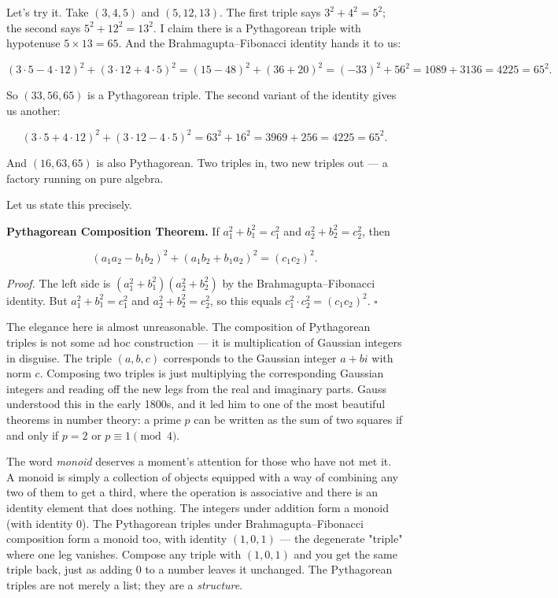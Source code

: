 Let's try it. Take $(3, 4, 5)$ and $(5, 12, 13)$. The first triple says $3^2 + 4^2 = 5^2$; the second says $5^2 + 12^2 = 13^2$. I claim there is a Pythagorean triple with hypotenuse $5 \times 13 = 65$. And the Brahmagupta--Fibonacci identity hands it to us:

\[(3 \cdot 5 - 4 \cdot 12)^2 + (3 \cdot 12 + 4 \cdot 5)^2 = (15 - 48)^2 + (36 + 20)^2 = (-33)^2 + 56^2 = 1089 + 3136 = 4225 = 65^2.\]

So $(33, 56, 65)$ is a Pythagorean triple. The second variant of the identity gives us another:

\[(3 \cdot 5 + 4 \cdot 12)^2 + (3 \cdot 12 - 4 \cdot 5)^2 = 63^2 + 16^2 = 3969 + 256 = 4225 = 65^2.\]

And $(16, 63, 65)$ is also Pythagorean. Two triples in, two new triples out --- a factory running on pure algebra.


Let us state this precisely.

\textbf{Pythagorean Composition Theorem.} If $a_1^2 + b_1^2 = c_1^2$ and $a_2^2 + b_2^2 = c_2^2$, then

\[(a_1 a_2 - b_1 b_2)^2 + (a_1 b_2 + b_1 a_2)^2 = (c_1 c_2)^2.\]

\textit{Proof.} The left side is $(a_1^2 + b_1^2)(a_2^2 + b_2^2)$ by the Brahmagupta--Fibonacci identity. But $a_1^2 + b_1^2 = c_1^2$ and $a_2^2 + b_2^2 = c_2^2$, so this equals $c_1^2 \cdot c_2^2 = (c_1 c_2)^2$. $\square$

The elegance here is almost unreasonable. The composition of Pythagorean triples is not some ad hoc construction --- it is multiplication of Gaussian integers in disguise. The triple $(a, b, c)$ corresponds to the Gaussian integer $a + bi$ with norm $c$. Composing two triples is just multiplying the corresponding Gaussian integers and reading off the new legs from the real and imaginary parts. Gauss understood this in the early 1800s, and it led him to one of the most beautiful theorems in number theory: a prime $p$ can be written as the sum of two squares if and only if $p = 2$ or $p \equiv 1 \pmod{4}$.


The word \textit{monoid} deserves a moment's attention for those who have not met it. A monoid is simply a collection of objects equipped with a way of combining any two of them to get a third, where the operation is associative and there is an identity element that does nothing. The integers under addition form a monoid (with identity $0$). The Pythagorean triples under Brahmagupta--Fibonacci composition form a monoid too, with identity $(1, 0, 1)$ --- the degenerate "triple" where one leg vanishes. Compose any triple with $(1, 0, 1)$ and you get the same triple back, just as adding $0$ to a number leaves it unchanged. The Pythagorean triples are not merely a list; they are a \textit{structure}.


